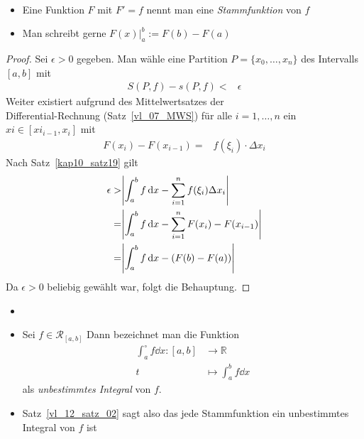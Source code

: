\begin{Bemerkung}{
	~\begin{itemize}
		\item Eine Funktion $F$ mit $F'=f$ nennt man eine \emph{Stammfunktion} 
		von $f$
		\item Man schreibt gerne $F(x) \vert_a^b := F(b) -F(a)$
	\end{itemize}
}\end{Bemerkung}

\begin{proof}
	Sei $\epsilon >0 $ gegeben. Man wähle eine Partition $P = \{x_0, \hdots, x_n\}$ 
	des Intervalls $[a,b]$ mit 
	\begin{align*}
		S(P,f) - s(P,f) < & \epsilon
	\end{align*}
	Weiter existiert aufgrund des Mittelwertsatzes der \\Differential-Rechnung
	(Satz~\ref{vl_07_MWS}) für alle $i = 1, \hdots, n$ ein $ xi \in 
	[xi_{i-1},x_i]$ mit 
	\begin{align*}
		F(x_i) - F(x_{i-1}) = &  f(\xi_i) \cdot \Delta x_i
	\end{align*}
	Nach Satz~\ref{kap10_satz19} gilt 
	\begin{align*}
		\epsilon > & \abs{ \int_a^b f \dd{x} - \sum_{i=1}^n f(\xi_i) \Delta x_i} \\
		= & \abs{ \int_a^b f \dd{x} - \sum_{i=1}^n F(x_i) -F(x_{i-1})} \\
		= & \abs{ \int_a^b f \dd{x} - (F(b) -F(a))}
	\end{align*}
	Da $\epsilon > 0$ beliebig gewählt war, folgt die Behauptung.	
\end{proof}

\begin{Bemerkung}{
	\begin{itemize}
	\item[ ]
		\item Sei $f \in \mathcal{R}_{[a,b]}$ Dann bezeichnet man die Funktion 
		\begin{align*}
			\int_a^{\circ} f\dd{x} :  [a,b]  & \rightarrow \mathbb{R} \\
			 t & \mapsto \int_a^b f\dd{x}
		\end{align*}
		als \emph{unbestimmtes Integral} von $f$.
		\item Satz~\ref{vl_12_satz_02}
		sagt also das jede Stammfunktion ein unbestimmtes Integral von $f$ ist 
	\end{itemize}
}\end{Bemerkung}

